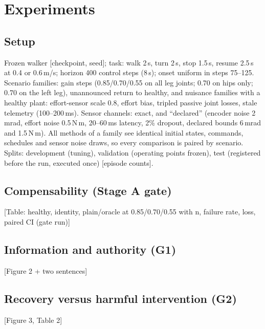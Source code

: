 \documentclass[10pt,twocolumn]{article}
\newcommand{\todo}[1]{\textcolor{red!70!black}{[#1]}}
\begin{document}
\section{Experiments}
\subsection{Setup}
Frozen walker \todo{checkpoint, seed}; task: walk 2\,s, turn 2\,s, stop 1.5\,s, resume 2.5\,s
at 0.4 or 0.6\,m/s; horizon 400 control steps (8\,s); onset uniform in steps 75--125.
Scenario families: gain steps (0.85/0.70/0.55 on all leg joints; 0.70 on hips only; 0.70
on the left leg), unannounced return to healthy, and nuisance families with a healthy
plant: effort-sensor scale 0.8, effort bias, tripled passive joint losses, stale telemetry
(100--200\,ms). Sensor channels: exact, and ``declared'' (encoder noise 2\,mrad, effort noise
0.5\,N\,m, 20--60\,ms latency, 2\% dropout, declared bounds 6\,mrad and 1.5\,N\,m). All methods
of a family see identical initial states, commands, schedules and sensor noise draws, so
every comparison is paired by scenario. Splits: development (tuning), validation (operating
points frozen), test (registered before the run, executed once) \todo{episode counts}.

\subsection{Compensability (Stage A gate)}
\todo{Table: healthy, identity, plain/oracle at 0.85/0.70/0.55 with n, failure rate, loss, paired CI (gate run)}

\subsection{Information and authority (G1)}
\todo{Figure 2 + two sentences}

\subsection{Recovery versus harmful intervention (G2)}
\todo{Figure 3, Table 2}
\end{document}
